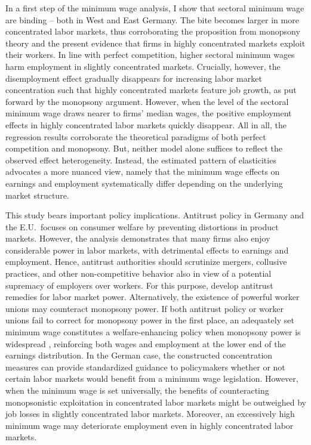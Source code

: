 \documentclass[11pt,oneside,reqno,xcolor=dvipsnames]{article} %
\begin{document}
In a first step of the minimum wage analysis, I show that sectoral minimum wage are binding -- both in West and East Germany. The bite becomes larger in more concentrated labor markets, thus corroborating the proposition from monopsony theory and the present evidence that firms in highly concentrated markets exploit their workers. In line with perfect competition, higher sectoral minimum wages harm employment in slightly concentrated markets. Crucially, however, the disemployment effect gradually disappears for increasing labor market concentration such that highly concentrated markets feature job growth, as put forward by the monopsony argument. However, when the level of the sectoral minimum wage draws nearer to firms' median wages, the positive employment effects in highly concentrated labor markets quickly disappear. All in all, the regression results corroborate the theoretical paradigms of both perfect competition and monopsony. But, neither model alone suffices to reflect the observed effect heterogeneity. Instead, the estimated pattern of elasticities advocates a more nuanced view, namely that the minimum wage effects on earnings and employment systematically differ depending on the underlying market structure.


This study bears important policy implications. Antitrust policy in Germany and the E.U.\ focuses on consumer welfare by preventing distortions in product markets. However, the analysis demonstrates that many firms also enjoy considerable power in labor markets, with detrimental effects to earnings and employment. Hence, antitrust authorities should scrutinize mergers, collusive practices, and other non-competitive behavior also in view of a potential supremacy of employers over workers. For this purpose, \citet{NaiduEtAl2018} develop antitrust remedies for labor market power. Alternatively, the existence of powerful worker unions may counteract monopsony power. If both antitrust policy or worker unions fail to correct for monopsony power in the first place, an adequately set minimum wage constitutes a welfare-enhancing policy when monopsony power is widespread \citep{BergerEtAl2019}, reinforcing both wages and employment at the lower end of the earnings distribution. In the German case, the constructed concentration measures can provide standardized guidance to policymakers whether or not certain labor markets would benefit from a minimum wage legislation. However, when the minimum wage is set universally, the benefits of counteracting monopsonistic exploitation in concentrated labor markets might be outweighed by job losses in slightly concentrated labor markets. Moreover, an excessively high minimum wage may deteriorate employment even in highly concentrated labor markets.
\end{document}
